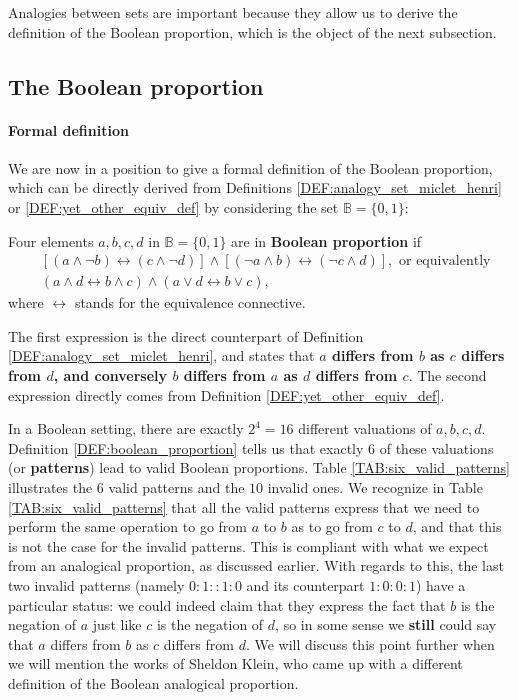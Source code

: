 Analogies between sets are important because they allow us to derive the
definition of the Boolean proportion, which is the object of the next
subsection.

\subsection{The Boolean proportion}

\paragraph{Formal definition\\}

We are now in a position to give a formal definition of the Boolean proportion,
which can be directly derived from Definitions
\ref{DEF:analogy_set_miclet_henri} or \ref{DEF:yet_other_equiv_def} by
considering the set $\mathbb{B} = \{0, 1\}$:

\begin{definition}
  \label{DEF:boolean_proportion}
  Four elements $a, b, c, d$ in $\mathbb{B} = \{0, 1\}$ are in \textbf{Boolean
  proportion} if
  \begin{align*}
    &\left[(a \wedge \neg b) \leftrightarrow (c \wedge \neg d)\right]  \wedge
    \left[(\neg a \wedge b)\leftrightarrow (\neg c \wedge d)\right], \text{ or equivalently}\\
    &  (a \wedge d \leftrightarrow b \wedge c) \wedge (a \vee  d
    \leftrightarrow b \vee c),
  \end{align*}
  where $\leftrightarrow$ stands for the equivalence connective.
\end{definition}

The first expression is the direct counterpart of Definition
\ref{DEF:analogy_set_miclet_henri}, and states that \textbf{$a$ differs from
$b$ as $c$ differs from $d$, and conversely $b$ differs from $a$ as $d$ differs
from $c$}.  The second expression directly comes from Definition
\ref{DEF:yet_other_equiv_def}.

In a Boolean setting, there are exactly $2^4 = 16$ different valuations of $a,
b, c, d$. Definition \ref{DEF:boolean_proportion} tells us that exactly $6$ of
these valuations (or \textbf{patterns}) lead to valid Boolean proportions.
Table \ref{TAB:six_valid_patterns} illustrates the $6$ valid patterns and the
$10$ invalid ones. We recognize in Table \ref{TAB:six_valid_patterns} that all
the valid patterns express that we need to perform the same operation to go
from $a$ to $b$ as to go from $c$ to $d$, and that this is not the case for the
invalid patterns. This is compliant with what we expect from an analogical
proportion, as discussed earlier. With regards to this, the last two invalid
patterns (namely $0:1::1:0$ and its counterpart $1:0:0:1$) have a particular
status: we could indeed claim that they express the fact that $b$ is the
negation of $a$ just like $c$ is the negation of $d$, so in some sense we
\textbf{still} could say that $a$ differs from $b$ as $c$ differs from $d$. We
will discuss this point further when we will mention the works of Sheldon
Klein, who came up with a different definition of the Boolean analogical
proportion.

